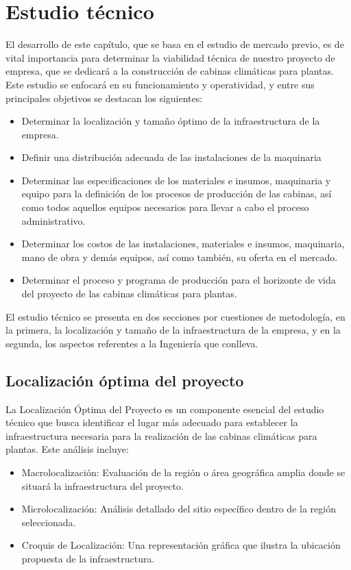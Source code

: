 \chapter{Estudio técnico}

El desarrollo de este capítulo, que se basa en el estudio de mercado previo, es de vital importancia para determinar la viabilidad técnica de nuestro proyecto de empresa, que se dedicará a la construcción de cabinas climáticas para plantas. Este estudio se enfocará en su funcionamiento y operatividad, y entre sus principales objetivos se destacan los siguientes: 
\begin{itemize}
    \item Determinar la localización y tamaño óptimo de la infraestructura de la empresa. 
    \item Definir una distribución adecuada de las instalaciones de la maquinaria
    \item Determinar las especificaciones de los materiales e insumos, maquinaria y equipo para la definición de los procesos de producción de las cabinas, así como todos aquellos equipos necesarios para llevar a cabo el proceso administrativo. 
    \item Determinar los costos de las instalaciones, materiales e insumos, maquinaria, mano de obra y demás equipos, así como también, su oferta en el mercado.
    \item Determinar el proceso y programa de producción para el horizonte de vida del proyecto de las cabinas climáticas para plantas. 
\end{itemize}

El estudio técnico se presenta en dos secciones por cuestiones de metodología, en la primera, la localización y tamaño de la infraestructura de la empresa, y en la segunda, los aspectos referentes a la Ingeniería que conlleva.

\section{Localización óptima del proyecto}
La Localización Óptima del Proyecto es un componente esencial del estudio técnico que busca identificar el lugar más adecuado para establecer la infraestructura necesaria para la realización de las cabinas climáticas para plantas. Este análisis incluye:

\begin{itemize}
    \item Macrolocalización: Evaluación de la región o área geográfica amplia donde se situará la infraestructura del proyecto.
    \item Microlocalización: Análisis detallado del sitio específico dentro de la región seleccionada.
    \item Croquis de Localización: Una representación gráfica que ilustra la ubicación propuesta de la infraestructura.
\end{itemize}

